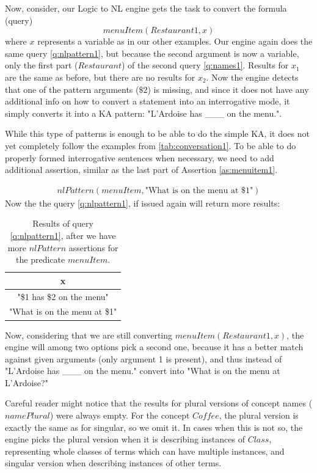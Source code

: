 Now, consider, our Logic to NL engine gets the task to convert the formula
(query)
\begin{equation}
menuItem(Restaurant1,x)
\end{equation}
where $x$ represents a variable as in our other examples. Our engine again does the same query \ref{q:nlpattern1}, but because
the second argument is now a variable, only the first part ($Restaurant$) of 
the second query \ref{q:names1}. Results for $x_1$ are the same as before,
but there are no results for $x_2$. Now the engine detects that one of the 
pattern arguments ($\$2$) is missing, and since it does not have any additional
info on how to convert a statement into an interrogative mode, it simply
converts it into a KA pattern: "L'Ardoise has \_\_\_ on the menu.".

While this type of patterns is enough to be able to do the simple KA, it
does not yet completely follow the examples from \autoref{tab:conversation1}. To
be able to do properly formed interrogative sentences when necessary, we need
to add additional assertion, similar as the last part of Assertion 
\ref{as:menuitem1}.

\begin{equation}\label{as:menuitem2}
\begin{gathered}
	nlPattern(menuItem, \text{"What is on the menu at \$1"})
\end{gathered}
\end{equation}
Now the the query \ref{q:nlpattern1}, if issued again will return more
results:
\begin{table}[H]
\centering
\caption{Results of query \ref{q:nlpattern1}, after we have more $nlPattern$ 
assertions for the predicate $menuItem$.}
\label{tab:results3}
\begin{tabular}{|c|}
	\hline
	\textbf{x} \\
    \hline
    "\$1 has \$2 on the menu" \\
    \hline
	"What is on the menu at \$1" \\
	\hline
\end{tabular}
\end{table}
Now, considering that we are still converting $menuItem(Restaurant1,x)$, the
engine will among two options pick a second one, because it has a better match
against given arguments (only argument 1 is present), and thus instead of
"L'Ardoise has \_\_\_ on the menu." convert into 
"What is on the menu at L'Ardoise?"

Careful reader might notice that the results for plural versions of concept 
names ($namePlural$) were always empty. For the concept $Coffee$, the plural
version is exactly the same as for singular, so we omit it. In cases when
this is not so, the engine picks the plural version when it is describing
instances of $Class$, representing whole classes of terms which can have 
multiple instances, and singular version when describing instances of
other terms.

